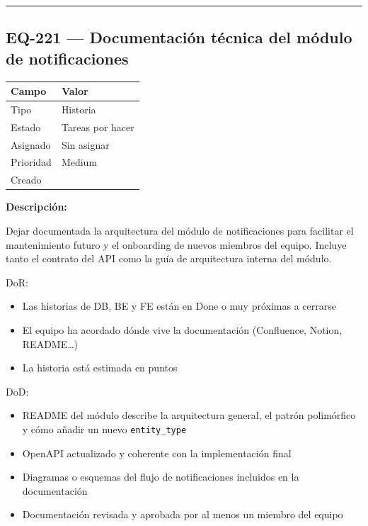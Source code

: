 \documentclass[
  spanish,
  11pt,
]{report}
\newcounter{none} %
\providecommand{\tightlist}{%
  \setlength{\itemsep}{0pt}\setlength{\parskip}{0pt}}
\begin{document}
\begin{center}\rule{0.5\linewidth}{0.5pt}\end{center}

\subsection{EQ-221 --- Documentación técnica del módulo de
notificaciones}\label{eq-221-documentaciuxf3n-tuxe9cnica-del-muxf3dulo-de-notificaciones}

{\def\LTcaptype{none} %
\begin{longtable}[]{@{}ll@{}}
\toprule\noalign{}
Campo & Valor \\
\midrule\noalign{}
\endhead
\bottomrule\noalign{}
\endlastfoot
Tipo & Historia \\
Estado & Tareas por hacer \\
Asignado & Sin asignar \\
Prioridad & Medium \\
Creado & \\
\end{longtable}
}

\textbf{Descripción:}

Dejar documentada la arquitectura del módulo de notificaciones para
facilitar el mantenimiento futuro y el onboarding de nuevos miembros del
equipo. Incluye tanto el contrato del API como la guía de arquitectura
interna del módulo.

DoR:

\begin{itemize}
\tightlist
\item
  Las historias de DB, BE y FE están en Done o muy próximas a cerrarse
\item
  El equipo ha acordado dónde vive la documentación (Confluence, Notion,
  README\ldots)
\item
  La historia está estimada en puntos
\end{itemize}

DoD:

\begin{itemize}
\tightlist
\item
  README del módulo describe la arquitectura general, el patrón
  polimórfico y cómo añadir un nuevo \texttt{entity\_type}
\item
  OpenAPI actualizado y coherente con la implementación final
\item
  Diagramas o esquemas del flujo de notificaciones incluidos en la
  documentación
\item
  Documentación revisada y aprobada por al menos un miembro del equipo
\end{itemize}
\end{document}

